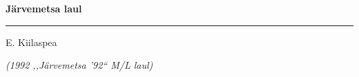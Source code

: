 \documentclass[12pt]{extbook}
\begin{document}
\pagebreak[3]
\clearpage
{
  \samepage
  \raggedbottom
  \raggedright
  \sloppy


  \vspace{0.2in}
    \centerline{
      \bfseries
      \large J\"arvemetsa laul
    }
  \nopagebreak[4]
  \vspace{0.1in}
  \nopagebreak[4]
  \hrule height 0.05ex
  \nopagebreak[4]
  \vspace{-0.05in}

  {\footnotesize  \hfill E. Kiilaspea }\\
  \vspace{0.01in}

  {\em {\footnotesize (1992 ,,J\"arvemetsa '92{``} M/L laul) } }
  \vspace{0.01in}

  \nopagebreak[4]
  {%
\parindent 0pt
\noindent
\ifx\preLilyPondExample \undefined
\else
  \expandafter\preLilyPondExample
\fi
\def\lilypondbook{}%

\ifx\postLilyPondExample \undefined
\else
  \expandafter\postLilyPondExample
\fi
}
  \vspace{-0.1in}

}
\end{document}
